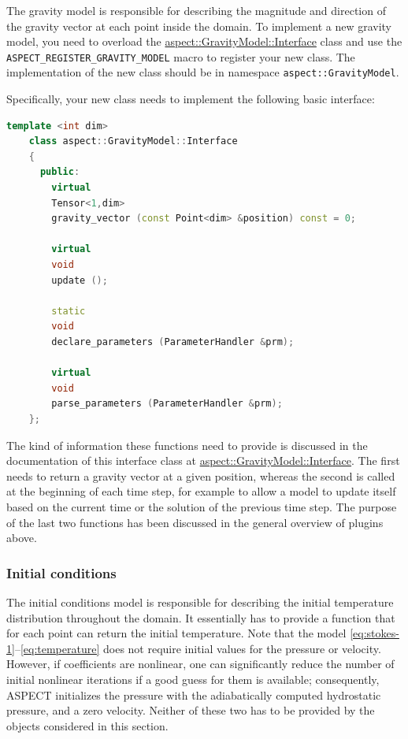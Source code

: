 \documentclass{article}
\newcommand{\aspect}{\textsc{ASPECT}}
\begin{document}
The gravity model is responsible for describing the magnitude and direction of
the gravity vector at each point inside the domain. To implement a new gravity model, you
need to overload the
\href{doc/doxygen/classaspect_1_1GravityModel_1_1Interface.html}{aspect::GravityModel::Interface}
class and use
the \texttt{ASPECT\_REGISTER\_GRAVITY\_MODEL} macro to register your new
class. The implementation of the new class should be in namespace
\texttt{aspect::GravityModel}.

Specifically, your new class needs to implement the following basic interface:
\begin{lstlisting}[frame=single,language=C++]
    template <int dim>
    class aspect::GravityModel::Interface
    {
      public:
        virtual
        Tensor<1,dim>
        gravity_vector (const Point<dim> &position) const = 0;

        virtual
        void
        update ();

        static
        void
        declare_parameters (ParameterHandler &prm);

        virtual
        void
        parse_parameters (ParameterHandler &prm);
    };
\end{lstlisting}
The kind of information these functions need to provide is discussed in the
documentation of this interface class at
\href{doc/doxygen/classaspect_1_1GravityModel_1_1Interface.html}{aspect::GravityModel::Interface}. The first needs to return a gravity
vector at a given position, whereas the second is called at the beginning of
each time step, for example to allow a model to update itself based on the
current time or the solution of the previous time step.
The purpose of the last two functions has been
discussed in the general overview of plugins above.


\subsubsection{Initial conditions}
\label{sec:initial-conditions}

The initial conditions model is responsible for describing the initial
temperature distribution throughout the domain. It essentially has to provide
a function that for each point can return the initial temperature. Note that
the model \eqref{eq:stokes-1}--\eqref{eq:temperature} does not require initial
values for the pressure or velocity. However, if coefficients are nonlinear,
one can significantly reduce the number of initial nonlinear iterations if a
good guess for them is available; consequently, \aspect{} initializes the
pressure with the adiabatically computed hydrostatic pressure, and a zero
velocity. Neither of these two has to be provided by the objects considered in
this section.
\end{document}

